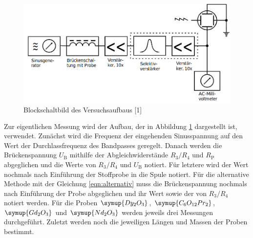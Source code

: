 \begin{figure} [H]
    \centering
    \includegraphics[scale=0.3]{content/bild2.png}
    \caption{Blockschaltbild des Versuchsaufbaus [1]}
    \label{fig:plot2}
  \end{figure}

Zur eigentlichen Messung wird der Aufbau, der in Abbildung \ref{fig:plot2}
dargestellt ist, verwendet. Zunächst wird die Frequenz der eingehenden Sinusspannung
auf den Wert der Durchlassfrequenz des Bandpasses geregelt. Danach werden die
Brückenspannung $U_\text{B}$ mithilfe der Abgleichwiderstände $R_3 / R_4$ und $R_\text{P}$
abgeglichen und die Werte von $R_3 / R_4$ und $U_\text{B}$ notiert. Für letztere wird der
Wert nochmals nach Einführung der Stoffprobe in die Spule notiert.
Für die alternative Methode mit der Gleichung \eqref{eqn:alternativ} 
muss die Brückenspannung nochmals nach Einführung der Probe abgeglichen und ihr Wert
sowie der von $R_3 / R_4$ notiert werden.
Für die Proben $\symup{Dy_2O_3}$, $\symup{C_6O_{12}Pr_2}$, 
$\symup{Gd_2O_3}$ und $\symup{Nd_2O_3}$ werden jeweils drei Messungen durchgeführt.
Zuletzt werden noch die jeweiligen Längen und Massen der Proben bestimmt.





